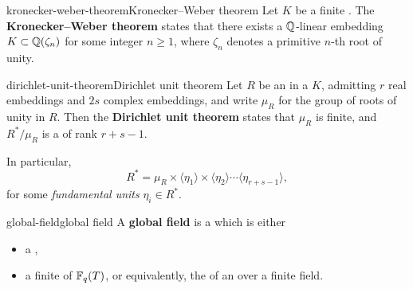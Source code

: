 \begin{topic}{kronecker-weber-theorem}{Kronecker--Weber theorem}
    Let $K$ be a finite . The \textbf{Kronecker--Weber theorem} states that there exists a $\mathbb{Q}$-linear embedding $K \subset \mathbb{Q}(\zeta_n)$ for some integer $n \ge 1$, where $\zeta_n$ denotes a primitive $n$-th root of unity.
\end{topic}

\begin{topic}{dirichlet-unit-theorem}{Dirichlet unit theorem}
    Let $R$ be an  in a  $K$, admitting $r$ real embeddings and $2s$ complex embeddings, and write $\mu_R$ for the group of roots of unity in $R$. Then the \textbf{Dirichlet unit theorem} states that $\mu_R$ is finite, and $R^*/\mu_R$ is a  of rank $r + s - 1$.
    
    In particular,
    \[ R^* = \mu_R \times \langle \eta_1 \rangle \times \langle \eta_2 \rangle \cdots \langle \eta_{r + s - 1} \rangle , \]
    for some \textit{fundamental units} $\eta_i \in R^*$.
\end{topic}

\begin{topic}{global-field}{global field}
    A \textbf{global field} is a  which is either
    \begin{itemize}
        \item a ,
        \item a finite  of $\mathbb{F}_q(T)$, or equivalently, the  of an  over a finite field.
    \end{itemize}
\end{topic}
